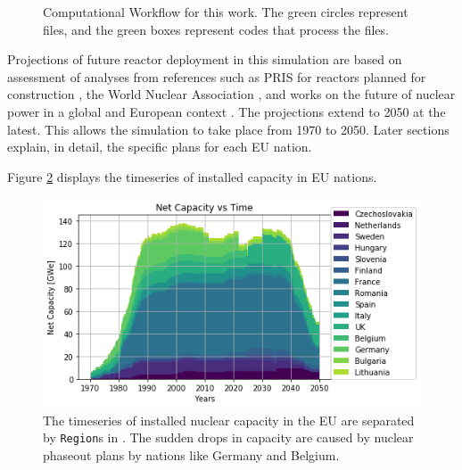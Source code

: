 \begin{figure}
        \centering


\caption{Computational Workflow for this work. The green circles represent files, and the green
         boxes represent codes that process the files.}
\label{diag:comp}
\end{figure}

Projections of future reactor deployment in this simulation are based on assessment of analyses
from references such as \gls{PRIS} for reactors planned for construction \cite{iaea_nuclear_2017},
the World Nuclear Association \cite{Worldd_nuclear_association_nuclear_2017}, and works on the future of nuclear power in a global \cite{joskow_future_2012} and European context \cite{hatch_politics_2015}. 
The projections extend to 2050 at the latest. This allows the simulation to take place from
1970 to 2050. Later sections explain, in detail, the specific plans for each \gls{EU} nation.

Figure \ref{fig:eu_pow} displays the
timeseries of installed capacity in \gls{EU} nations.

\begin{figure}[htbp!]
	\begin{center}
		\includegraphics[scale=0.7]{./images/eu_future/power_plot.png}
	\end{center}
	\caption{The timeseries of installed nuclear capacity in the EU are separated by \texttt{Region}s in \Cyclus.
			 The sudden drops in capacity are caused by nuclear phaseout plans by nations like Germany and Belgium.
			 }
	\label{fig:eu_pow}
\end{figure}
\FloatBarrier

